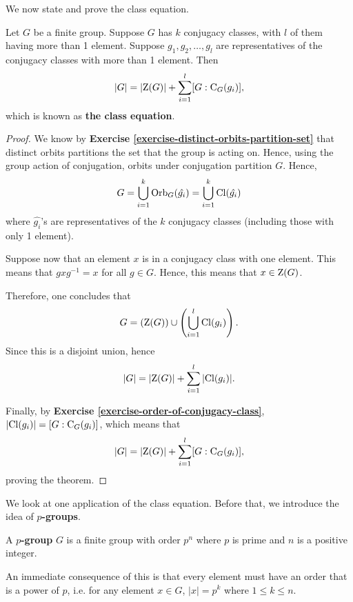 We now state and prove the class equation.
\begin{theorem}\label{thrm-class-equation}
    Let $G$ be a finite group. Suppose $G$ has $k$ conjugacy classes, with $l$ of them having more than 1 element. Suppose $g_1, g_2, \dots, g_l$ are representatives of the conjugacy classes with more than 1 element. Then
    \[
        |G| = |\mathrm{Z}(G)| + \sum_{i=1}^l [G : \mathrm{C}_{G}(g_i)],
    \]
    which is known as \textbf{the class equation}.
\end{theorem}

\begin{proof}
    We know by \textbf{Exercise \ref{exercise-distinct-orbits-partition-set}} that distinct orbits partitions the set that the group is acting on. Hence, using the group action of conjugation, orbits under conjugation partition $G$. Hence,
    \[
        G = \bigcup_{i=1}^k \mathrm{Orb}_{G}(\hat{g_i}) = \bigcup_{i=1}^k \mathrm{Cl}(\hat{g_i})
    \]
    where $\hat{g_i}$'s are representatives of the $k$ conjugacy classes (including those with only 1 element).

    Suppose now that an element $x$ is in a conjugacy class with one element. This means that $gxg^{-1} = x$ for all $g \in G$. Hence, this means that $x \in \mathrm{Z}(G)$.

    Therefore, one concludes that
    \[
        G = \left(\mathrm{Z}(G)\right) \cup \left(\bigcup_{i=1}^l \mathrm{Cl}(g_i)\right).
    \]
    Since this is a disjoint union, hence
    \[
        |G| = |\mathrm{Z}(G)| + \sum_{i=1}^l |\mathrm{Cl}(g_i)|.
    \]

    Finally, by \textbf{Exercise \ref{exercise-order-of-conjugacy-class}}, $|\mathrm{Cl}(g_i)| = [G : \mathrm{C}_{G}(g_i)]$, which means that
    \[
        |G| = |\mathrm{Z}(G)| + \sum_{i=1}^l [G:\mathrm{C}_{G}(g_i)],
    \]
    proving the theorem.
\end{proof}

We look at one application of the class equation. Before that, we introduce the idea of \textbf{$p$-groups}.
\begin{definition}
    A \textbf{$p$-group} $G$ is a finite group with order $p^n$ where $p$ is prime and $n$ is a positive integer.
\end{definition}
An immediate consequence of this is that every element must have an order that is a power of $p$, i.e. for any element $x \in G$, $|x| = p^k$ where $1 \leq k \leq n$.

